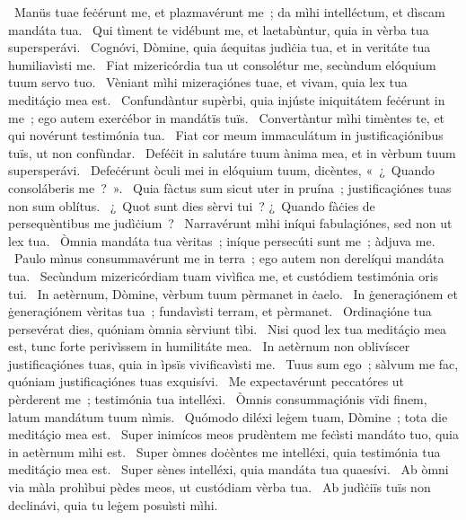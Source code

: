 \psalmBody
{%
~Manüs tuae feċérunt me, et plazmavérunt me~; da mìhi intelléctum, et dìscam mandáta tua.
~Qui tìment te vidébunt me, et laetabùntur, quia in vèrba tua supersperávi.
~Cognóvi, Dòmine, quia áequitas judìċia tua, et in veritáte tua humiliavìsti me.
~Fiat mizericórdia tua ut consolétur me, secùndum elóquium tuum servo tuo.
~Vèniant mìhi mizeraçiónes tuae, et vivam, quia lex tua meditáçio mea est.
~Confundàntur supèrbi, quia injúste iniquitátem feċérunt in me~; ego autem exerċébor in mandátïs tuïs.
~Convertàntur mìhi timèntes te, et qui novérunt testimónia tua.
~Fiat cor meum immaculátum in justificaçiónibus tuïs, ut non confùndar.
~Deféċit in salutáre tuum ànima mea, et in vèrbum tuum supersperávi.
~Defeċérunt òculi mei in elóquium tuum, dicèntes, «~¿~Quando consoláberis me~?~».
~Quia fàctus sum sicut uter in pruína~; justificaçiónes tuas non sum oblítus.
~¿~Quot sunt dies sèrvi tui~? ¿~Quando fàċies de persequèntibus me judìċium~?
~Narravérunt mìhi iníqui fabulaçiónes, sed non ut lex tua.
~Òmnia mandáta tua vèritas~; iníque persecúti sunt me~; àdjuva me.
~Paulo mìnus consummavérunt me in terra~; ego autem non derelíqui mandáta tua.
~Secùndum mizericórdiam tuam vivìfica me, et custódiem testimónia oris tui.
~In aetèrnum, Dòmine, vèrbum tuum pèrmanet in ċaelo.
~In ġeneraçiónem et ġeneraçiónem vèritas tua~; fundavìsti terram, et pèrmanet.
~Ordinaçióne tua persevérat dies, quóniam òmnia sèrviunt tìbi.
~Nisi quod lex tua meditáçio mea est, tunc forte perivìssem in humilitáte mea.
~In aetèrnum non oblivíscer justificaçiónes tuas, quia in ìpsïs vivificavìsti me.
~Tuus sum ego~; sàlvum me fac, quóniam justificaçiónes tuas exquisívi.
~Me expectavérunt peccatóres ut pèrderent me~; testimónia tua intelléxi.
~Òmnis consummaçiónis vïdi finem, latum mandátum tuum nìmis.
~Quómodo diléxi leġem tuam, Dòmine~; tota die meditáçio mea est.
~Super inimícos meos prudèntem me feċìsti mandáto tuo, quia in aetèrnum mìhi est.
~Super òmnes doċèntes me intelléxi, quia testimónia tua meditáçio mea est.
~Super sènes intelléxi, quia mandáta tua quaesívi.
~Ab òmni via màla prohìbui pèdes meos, ut custódiam vèrba tua.
~Ab judìċiïs tuïs non declinávi, quia tu leġem posuìsti mìhi.
}
